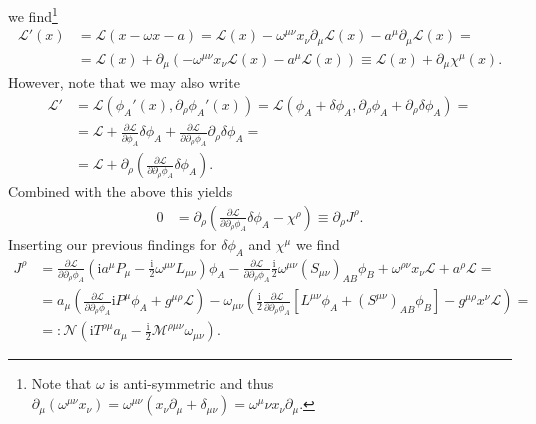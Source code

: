 \documentclass[english, parskip=full]{scrartcl}
\newcommand{\kla}{}
\renewcommand{\i}{\text{i}}
\begin{document}
we find\footnote{Note that $\omega$ is anti-symmetric and thus $\partial_\mu (\omega^{\mu\nu} x_\nu) = \omega^{\mu\nu} (x_\nu \partial_\mu + \delta_{\mu\nu}) = \omega^\mu\nu x_\nu \partial_\mu$.}
\begin{align}
\mathcal{L}'(x) &= \mathcal{L}(x - \omega x - a) = \mathcal{L}(x) - \omega^{\mu\nu} x_\nu \partial_\mu \mathcal{L}(x) - a^\mu \partial_\mu \mathcal{L}(x) = \\
&= \mathcal{L}(x) + \partial_\mu \kla\left( -\omega^{\mu\nu} x_\nu \mathcal{L}(x) - a^\mu \mathcal{L}(x) \right) \equiv \mathcal{L}(x) + \partial_\mu \chi^\mu(x).
\end{align}
However, note that we may also write
\begin{align}
\mathcal{L}' &= \mathcal{L}\kla\left( \phi_A'(x), \partial_\rho \phi_A'(x) \right) = \mathcal{L} \kla\left( \phi_A + \delta\phi_A, \partial_\rho \phi_A + \partial_\rho \delta\phi_A \right) = \\
&= \mathcal{L} + \frac{\partial \mathcal{L}}{\partial \phi_A} \delta\phi_A + \frac{\partial \mathcal{L}}{\partial \partial_\rho\phi_A}  \partial_\rho \delta\phi_A = \\
&= \mathcal{L} + \partial_\rho \kla\left( \frac{\partial \mathcal{L}}{\partial \partial_\rho\phi_A} \delta\phi_A \right).
\end{align}
Combined with the above this yields
\begin{align}
0 &= \partial_\rho \kla\left( \frac{\partial \mathcal{L}}{\partial \partial_\rho\phi_A} \delta\phi_A - \chi^\rho  \right) \equiv \partial_\rho J^\rho.
\end{align}
Inserting our previous findings for $\delta\phi_A$ and $\chi^\mu$ we find
\begin{align}
J^\rho &= \frac{\partial \mathcal{L}}{\partial \partial_\rho\phi_A} \kla\left( \i a^\mu P_\mu - \frac{\i}{2} \omega^{\mu\nu} L_{\mu\nu} \right) \phi_A - \frac{\partial \mathcal{L}}{\partial \partial_\rho\phi_A} \frac{\i}{2} \omega^{\mu\nu} (S_{\mu\nu})_{AB} \phi_B +  \omega^{\rho\nu} x_\nu \mathcal{L} + a^\rho \mathcal{L} = \\
&= a_\mu \kla\left( \frac{\partial \mathcal{L}}{\partial \partial_\rho\phi_A} \i P^\mu \phi_A + g^{\mu\rho} \mathcal{L} \right) - \omega_{\mu\nu} \kla\left( \frac{\i}{2} \frac{\partial \mathcal{L}}{\partial \partial_\rho\phi_A} \left[  L^{\mu\nu} \phi_A + (S^{\mu\nu})_{AB} \phi_B \right] - g^{\mu\rho} x^\nu \mathcal{L} \right) = \\
&=: \mathcal{N} \kla\left(  \i T^{\rho\mu} a_\mu - \frac{\i}{2} \mathcal{M}^{\rho\mu\nu} \omega_{\mu\nu} \right).
\end{align}
\end{document}
